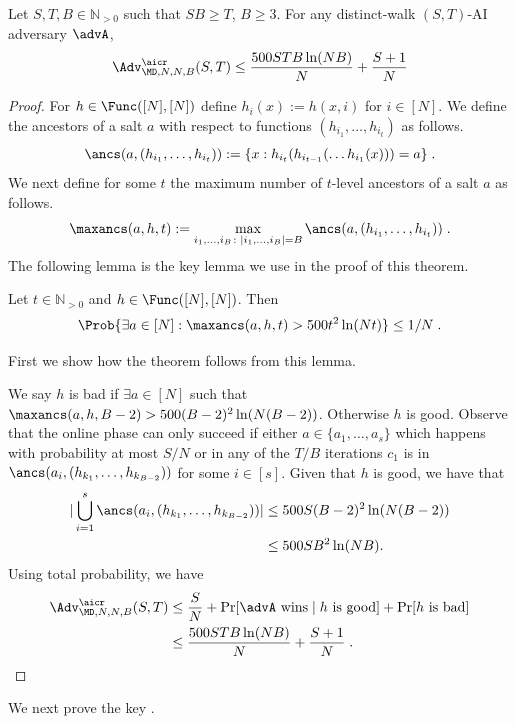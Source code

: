 \begin{theorem}\label{thm:mfa}
    Let $S,T,B\in \mathbb{N}_{>0}$ such that $SB\geq T$, $B\geq 3$. For any distinct-walk $(S,T)$-AI adversary $\advA$,
    \begin{align*}
    \Adv_{\MD,N,N,B}^{\aicr}(S,T) \leq \frac{500STB\ln(NB)}{N}+\frac{S+1}{N}    \end{align*}
\end{theorem}
\begin{proof}
For $h\in \Func([N],[N])$ define $h_i(x):=h(x,i)$ for $i\in [N]$. We define the ancestors of a salt $a$ with respect to functions $(h_{i_1},\ldots,h_{i_t})$ as follows.
\[
\ancs(a,(h_{i_1},\ldots,h_{i_t})):=\{x: h_{i_t}(h_{i_{t-1}}(\ldots h_{i_1}(x)))=a \}\;.
\] 
We next define for some $t$ the maximum number of $t$-level ancestors of a salt $a$ as follows.
\[
\maxancs(a,h,t):=\max_{{i_1},\ldots,{i_B}\colon |{i_1},\ldots,{i_B}|=B} \ancs(a,(h_{i_1},\ldots,h_{i_t}))\;.
\]
The following lemma is the key lemma we use in the proof of this theorem.
\begin{lemma}\label{lem:keymfa}
    Let $t\in \mathbb{N}_{>0}$ and $h\in \Func([N],[N])$. Then
    \[
    \Prob{\exists a\in [N]:\maxancs(a,h,t)>500t^2\ln (Nt)}\leq 1/N\;.   
    \]
\end{lemma}
First we show how the theorem follows from this lemma.

We say $h$ is bad if $\exists a\in [N]$ such that $\maxancs(a,h,B-2)>500(B-2)^2\ln (N(B-2))$. Otherwise $h$ is good.
%
Observe that the online phase can only succeed if either $a\in \{a_1,\ldots,a_s\}$ which happens with probability at most $S/N$ or in any of the $T/B$ iterations $c_1$ is in $\ancs(a_i,(h_{k_1},\ldots,h_{k_{B-2}}))$ for some $i\in [s]$. Given that $h$ is good, we have that
\begin{align*}
|\bigcup_{i=1}^s \ancs(a_i,(h_{k_1},\ldots,h_{k_{B-2}}))| & \leq 500S(B-2)^2\ln (N(B-2)) \\ & \leq 500SB^2\ln (NB).
\end{align*}
Using total probability, we have 
\begin{align*}
\Adv_{\MD,N,N,B}^{\aicr}(S,T) &\leq \frac{S}{N}+\Pr[\advA \text{ wins}\mid h \text{ is good}]+\Pr[h\text{ is bad}]\\
&\leq \frac{500STB\ln(NB)}{N}+\frac{S+1}{N}\;.
\end{align*}
\end{proof}
We next prove the key .
